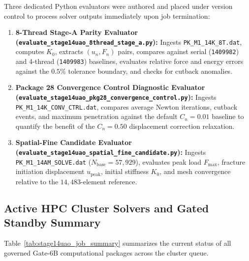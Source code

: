 Three dedicated Python evaluators were authored and placed under version control to process solver outputs immediately upon job termination:
\begin{enumerate}
  \item \textbf{8-Thread Stage-A Parity Evaluator (\texttt{evaluate\_stage14uao\_8thread\_stage\_a.py}):} Ingests \texttt{PK\_M1\_14K\_8T.dat}, computes $K_0$, extracts $(u_n, F_n)$ pairs, compares against serial (\texttt{1409982}) and 4-thread (\texttt{1409983}) baselines, evaluates relative force and energy errors against the $0.5\%$ tolerance boundary, and checks for cutback anomalies.
  \item \textbf{Package 28 Convergence Control Diagnostic Evaluator (\texttt{evaluate\_stage14uao\_pkg28\_convergence\_control.py}):} Ingests \texttt{PK\_M1\_14K\_CONV\_CTRL.dat}, compares average Newton iterations, cutback events, and maximum penetration against the default $C_n = 0.01$ baseline to quantify the benefit of the $C_n = 0.50$ displacement correction relaxation.
  \item \textbf{Spatial-Fine Candidate Evaluator (\texttt{evaluate\_stage14uao\_spatial\_fine\_candidate.py}):} Ingests \texttt{PK\_M1\_14AM\_SOLVE.dat} ($N_{\mathrm{base}} = 57{,}929$), evaluates peak load $F_{\max}$, fracture initiation displacement $u_{\mathrm{peak}}$, initial stiffness $K_0$, and mesh convergence relative to the $14{,}483$-element reference.
\end{enumerate}

\subsection{Active HPC Cluster Solvers and Gated Standby Summary}
\label{subsec:stage14uao_summary_table}

Table~\ref{tab:stage14uao_job_summary} summarizes the current status of all governed Gate-6B computational packages across the cluster queue.

